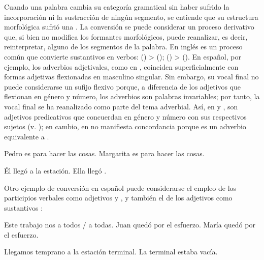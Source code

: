 Cuando una palabra cambia su categoría gramatical sin haber sufrido la
incorporación ni la sustracción de ningún segmento, se entiende que su
estructura morfológica sufrió una . La conversión se puede
considerar un proceso derivativo que, si bien no modifica los formantes
morfológicos, puede reanalizar, es decir, reinterpretar, alguno de los segmentos
de la palabra. En inglés es un proceso común que convierte sustantivos en
verbos:  () >  ();
 () >  (). En español, por
ejemplo, los adverbios adjetivales, como  en , coinciden superficialmente con formas adjetivas flexionadas en
masculino singular. Sin embargo, su vocal final no puede considerarse un sufijo
flexivo porque, a diferencia de los adjetivos que flexionan en género y número,
los adverbios son palabras invariables; por tanto, la vocal final se ha
reanalizado como parte del tema adverbial. Así, en  y
,  son adjetivos predicativos que
concuerdan en género y número con sus respectivos sujetos (v. ); en
cambio,  en  no manifiesta concordancia
porque es un adverbio equivalente a .

\begin{exe}
  \ex\label{ex:04-rapido}
    \begin{xlist}
      \ex\label{ex:04-rapido-a} Pedro es  para hacer las cosas.
      \ex\label{ex:04-rapido-b} Margarita es  para hacer las cosas.
    \end{xlist}
  \ex\label{ex:04-rapidoadv}
    \begin{xlist}
      \ex Él llegó  a la estación.
      \ex Ella llegó .
    \end{xlist}
\end{exe}

Otro ejemplo de conversión en español puede considerarse el empleo de los
participios verbales  como adjetivos
 y , y también el de los adjetivos
 como sustantivos :

\begin{exe}
  \ex\label{ex:04-agotado}
    \begin{xlist}
      \ex\label{ex:04-agotado-a} Este trabajo nos  a todos / a todas.
      \ex\label{ex:04-agotado-b} Juan quedó  por el esfuerzo.
      \ex\label{ex:04-agotado-c} María quedó  por el esfuerzo.
    \end{xlist}
  \ex\label{ex:04-terminal}
    \begin{xlist}
      \ex\label{ex:04-terminal-a} Llegamos temprano a la estación terminal.
      \ex\label{ex:04-terminal-b} La terminal estaba vacía.
    \end{xlist}
\end{exe}

